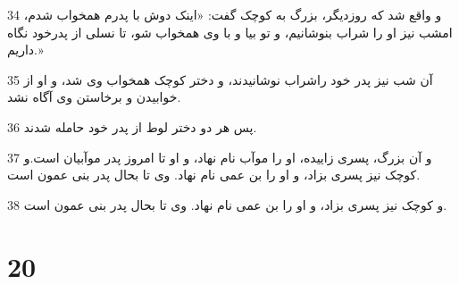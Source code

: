 \par 34 و واقع شد که روزدیگر، بزرگ به کوچک گفت: «اینک دوش با پدرم همخواب شدم، امشب نیز او را شراب بنوشانیم، و تو بیا و با وی همخواب شو، تا نسلی از پدرخود نگاه داریم.»
\par 35 آن شب نیز پدر خود راشراب نوشانیدند، و دختر کوچک همخواب وی شد، و او از خوابیدن و برخاستن وی آگاه نشد.
\par 36 پس هر دو دختر لوط از پدر خود حامله شدند.
\par 37 و آن بزرگ، پسری زاییده، او را موآب نام نهاد، و او تا امروز پدر موآبیان است.و کوچک نیز پسری بزاد، و او را بن عمی نام نهاد. وی تا بحال پدر بنی عمون است.
\par 38 و کوچک نیز پسری بزاد، و او را بن عمی نام نهاد. وی تا بحال پدر بنی عمون است.
 
\chapter{20}

